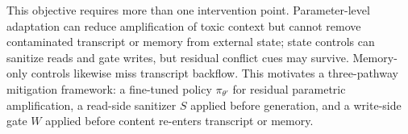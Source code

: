 This objective requires more than one intervention point. Parameter-level adaptation can reduce amplification of toxic context but cannot remove contaminated transcript or memory from external state; state controls can sanitize reads and gate writes, but residual conflict cues may survive. Memory-only controls likewise miss transcript backflow. This motivates a three-pathway mitigation framework: a fine-tuned policy $\pi_{\theta'}$ for residual parametric amplification, a read-side sanitizer $S$ applied before generation, and a write-side gate $W$ applied before content re-enters transcript or memory.